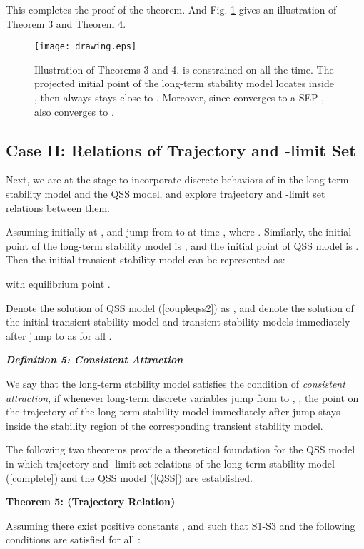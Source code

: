 \documentclass[journal]{IEEEtran}
\begin{document}
This completes the proof of the theorem. And Fig. \ref{QSSctnstable} gives an illustration of Theorem 3 and Theorem 4.

\begin{figure}[!ht]
\centering
\texttt{[image: drawing.eps]}\caption{Illustration of Theorems 3 and 4.  is constrained on  all the time. The projected initial point  of the long-term stability model locates inside , then  always stays close to . Moreover, since  converges to a SEP ,  also converges to .
}\label{QSSctnstable}
\end{figure}

\subsection{Case II: Relations of Trajectory and -limit Set}

Next, we are at the stage to incorporate discrete behaviors of  in the long-term stability model and the QSS model, and explore trajectory and -limit set relations between them.

Assuming  initially at , and jump from  to  at time , where . Similarly, the initial point of the long-term stability model is , and the initial point of QSS model is . Then the initial transient stability model can be represented as:

with equilibrium point .

Denote the solution of QSS model (\ref{coupleqss2}) as , and denote the solution of the initial transient stability model and transient stability models immediately after  jump to  as  for all .


\noindent\textit{\textbf{Definition 5: Consistent Attraction}}

We say that the long-term stability model satisfies the condition of \textit{consistent attraction}, if whenever long-term discrete variables jump from  to , , the point on the trajectory of the long-term stability model immediately after  jump stays inside the stability region of the corresponding transient stability model.

The following two theorems provide a theoretical foundation for the QSS model in which trajectory and -limit set relations of the long-term stability model (\ref{complete}) and the QSS model (\ref{QSS}) are established.

\noindent\textbf{Theorem 5: (Trajectory Relation)}

Assuming there exist positive constants ,  and  such that S1-S3 and the following conditions are satisfied for all :
\end{document}
